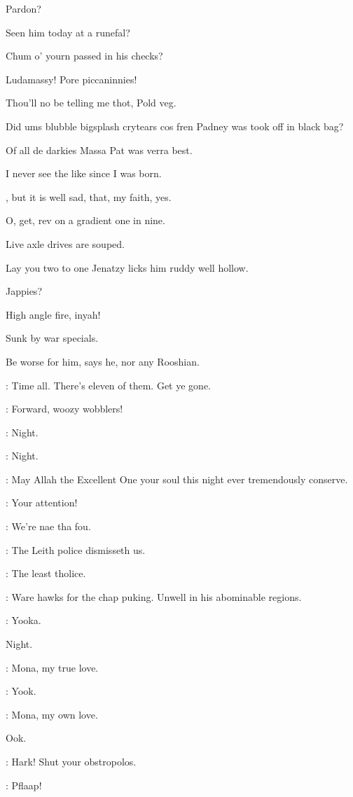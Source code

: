 \documentclass[12pt]{article}
\begin{document}
Pardon?

Seen him today at a runefal?

Chum o' yourn passed in his checks?

Ludamassy! Pore piccaninnies!

Thou'll no be telling me thot, Pold veg.

Did ums blubble bigsplash crytears cos fren Padney
was took off in black bag?

Of all de darkies Massa Pat was verra best.

I never see the like since I was born.

, but it is well sad, that, my faith, yes.

O, get, rev on a gradient one in nine.

Live axle drives are souped.

Lay you two to one Jenatzy licks him ruddy well hollow.

Jappies?

High angle fire, inyah!

Sunk by war specials.

Be worse for him, says he, nor any Rooshian.

\Br: Time all. There's eleven of them. Get ye gone.

\Ln: Forward, woozy wobblers!

\Ly: Night.

\PC: Night.

\Dx: May Allah the Excellent One your soul this night ever
tremendously conserve.


\Ln: Your attention!

\Cr: We're nae tha fou.

\Ly: The Leith police dismisseth us.

\Ln: The least tholice.

\PC: Ware hawks for the chap puking.
Unwell in his abominable regions.

\SD: Yooka.

Night.

\Cr: Mona, my true love.

\Ly: Yook.

\Cr: Mona, my own love.

Ook.


\Ly: Hark!
Shut your obstropolos.

: Pflaap!
\end{document}

